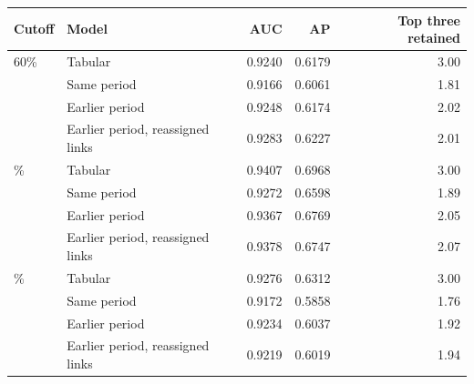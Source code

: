 \begin{tabular}{llrrr}
\toprule
Cutoff & Model & AUC & AP & Top three retained \\
\midrule
60\% & Tabular & 0.9240 & 0.6179 & 3.00 \\
 & Same period & 0.9166 & 0.6061 & 1.81 \\
 & Earlier period & 0.9248 & 0.6174 & 2.02 \\
 & Earlier period, reassigned links & 0.9283 & 0.6227 & 2.01 \\
\addlinespace
70\% & Tabular & 0.9407 & 0.6968 & 3.00 \\
 & Same period & 0.9272 & 0.6598 & 1.89 \\
 & Earlier period & 0.9367 & 0.6769 & 2.05 \\
 & Earlier period, reassigned links & 0.9378 & 0.6747 & 2.07 \\
\addlinespace
80\% & Tabular & 0.9276 & 0.6312 & 3.00 \\
 & Same period & 0.9172 & 0.5858 & 1.76 \\
 & Earlier period & 0.9234 & 0.6037 & 1.92 \\
 & Earlier period, reassigned links & 0.9219 & 0.6019 & 1.94 \\
\bottomrule
\end{tabular}
